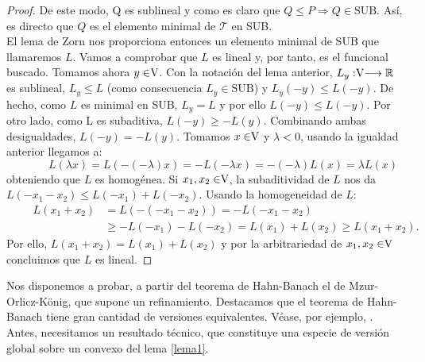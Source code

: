\begin{proof}
		De este modo, Q es sublineal y como es claro que $ Q \leq P \Longrightarrow Q \in \text{SUB} $. Así, es directo que $ Q $ es el elemento minimal de $ \mathcal{T} $ en SUB.\\
		
		El lema de Zorn nos proporciona entonces un elemento minimal de SUB que llamaremos $ L $. Vamos a comprobar que $ L $ es lineal y, por tanto, es el funcional buscado. Tomamos ahora $ y \in \vecSpace $. Con la notación del lema anterior, $ L_y : \vecSpace \longrightarrow \RR $ es sublineal, $ L_y \leq L $ (como consecuencia $ L_y \in \text{SUB} $) y $ L_y (-y) \leq L(-y) $. De hecho, como $ L $ es minimal en SUB, $ L_y = L $ y por ello $ L (-y) \leq L(-y) $. Por otro lado, como L es subaditiva, $ L(-y) \geq -L(y) $. Combinando ambas desigualdades, $ L(-y) = -L(y) $. Tomamos $ x \in \vecSpace $ y $ \lambda < 0 $, usando la igualdad anterior llegamos a:
		\[ \qquad \quad
		L(\lambda x) = L (-(-\lambda)x) = -L(-\lambda x) = -(-\lambda)L(x) = \lambda L(x) \label{1}
		\] 
		obteniendo que $ L $ es homogénea. Si $ x_1, x_2 \in \vecSpace $, la subaditividad de $ L $ nos da $ L(-x_1-x_2) \leq L(-x_1) + L(-x_2) $. Usando la homogeneidad de $ L $:
		\begin{equation*}
		\begin{split} \qquad
		L(x_1+x_2) &= L(-(-x_1-x_2)) = -L(-x_1-x_2) \\ 
		& \geq -L(-x_1)-L(-x_2) = L(x_1) + L (x_2) \geq L(x_1+x_2). 
		\end{split}
		\end{equation*}
		Por ello, $	L(x_1+x_2) = L(x_1) + L (x_2) $ y por la arbitrariedad de $ x_1, x_2 \in \vecSpace $ concluimos que $ L $ es lineal.
		
	\end{proof}
\bigskip

Nos disponemos a probar, a partir del teorema de Hahn-Banach el de Mzur-Orlicz-König, que supone un refinamiento. Destacamos que el teorema de Hahn-Banach tiene gran cantidad de versiones equivalentes. Véase, por ejemplo, \cite{schechter1996handbook}. Antes, necesitamos un resultado técnico, que constituye una especie de versión global sobre un convexo del lema \ref{lema1}.
	
